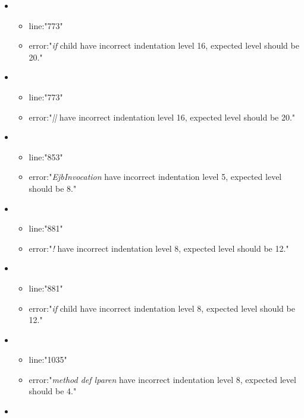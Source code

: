 
\begin{itemize}
\subsection{Indentation} %
\label{sub:indention}
	\item 
	\begin{itemize} 
		\item line:"773" 
		\item error:"\emph{if} child have incorrect indentation level 16, expected level should be 20." 
	\end{itemize}
	\item 
	\begin{itemize} 
		\item line:"773" 
		\item error:"\emph{||} have incorrect indentation level 16, expected level should be 20." 
	\end{itemize}
	\item 
	\begin{itemize} 
		\item line:"853" 
		\item error:"\emph{EjbInvocation} have incorrect indentation level 5, expected level should be 8." 
	\end{itemize}
	\item 
	\begin{itemize} 
		\item line:"881" 
		\item error:"\emph{!} have incorrect indentation level 8, expected level should be 12." 
	\end{itemize}
	\item 
	\begin{itemize} 
		\item line:"881" 
		\item error:"\emph{if} child have incorrect indentation level 8, expected level should be 12." 
	\end{itemize}
	\item 
	\begin{itemize} 
		\item line:"1035" 
		\item error:"\emph{method def lparen} have incorrect indentation level 8, expected level should be 4." 
	\end{itemize}
	\item 
	\begin{itemize} 

\end{itemize}
\end{itemize}
